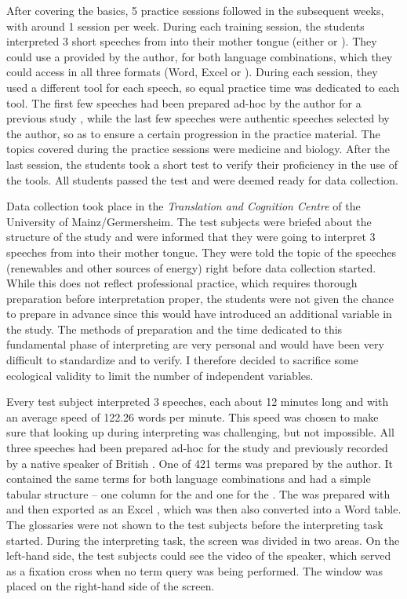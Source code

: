 \documentclass[output=paper]{langsci/langscibook}
\begin{document}
After covering the basics, 5 practice sessions followed in the subsequent weeks, with around 1 session per week. During each training session, the students interpreted 3 short speeches from  into their mother tongue (either  or ). They could use a  provided by the author, for both language combinations, which they could access in all three formats (Word, Excel or ). During each session, they used a different tool for each speech, so equal practice time was dedicated to each tool. The first few speeches had been prepared ad-hoc by the author for a previous study \citep{Prandi2015a, Prandi2015b}, while the last few speeches were authentic speeches selected by the author, so as to ensure a certain progression in the practice material. The topics covered during the practice sessions were medicine and biology. After the last session, the students took a short test to verify their proficiency in the use of the tools. All students passed the test and were deemed ready for data collection.

Data collection took place in the \textit{Translation and Cognition Centre} of the University of Mainz\slash Germersheim. The test subjects were briefed about the structure of the study and were informed that they were going to interpret 3 speeches from  into their mother tongue. They were told the topic of the speeches (renewables and other sources of energy) right before data collection started. While this does not reflect professional practice, which requires thorough preparation before interpretation proper, the students were not given the chance to prepare in advance since this would have introduced an additional variable in the study. The methods of preparation and the time dedicated to this fundamental phase of interpreting are very personal and would have been very difficult to standardize and to verify. I therefore decided to sacrifice some ecological validity to limit the number of independent variables.

Every test subject interpreted 3 speeches, each about 12 minutes long and with an average speed of 122.26 words per minute. This speed was chosen to make sure that looking up  during interpreting was challenging, but not impossible. All three speeches had been prepared ad-hoc for the study and previously recorded by a native speaker of British . One  of 421 terms was prepared by the author. It contained the same terms for both language combinations and had a simple tabular structure – one column for the  and one for the . The  was prepared with  and then exported as an Excel , which was then also converted into a Word table. The glossaries were not shown to the test subjects before the interpreting task started. During the interpreting task, the screen was divided in two areas. On the left-hand side, the test subjects could see the video of the speaker, which served as a fixation cross when no term query was being performed. The  window was placed on the right-hand side of the screen.
\end{document}
